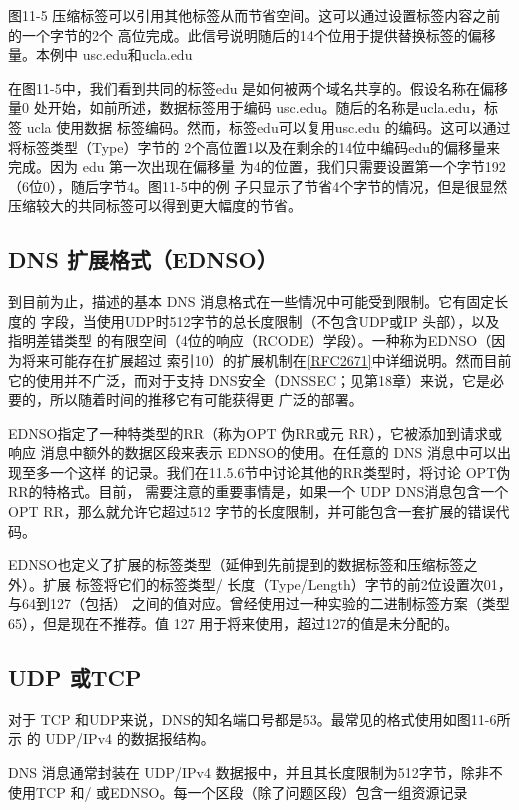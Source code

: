 图11-5 压缩标签可以引用其他标签从而节省空间。这可以通过设置标签内容之前的一个字节的2个
高位完成。此信号说明随后的14个位用于提供替换标签的偏移量。本例中 usc.edu和ucla.edu

在图11-5中，我们看到共同的标签edu 是如何被两个域名共享的。假设名称在偏移量0
处开始，如前所述，数据标签用于编码 usc.edu。随后的名称是ucla.edu，标签 ucla 使用数据
标签编码。然而，标签edu可以复用usc.edu 的编码。这可以通过将标签类型（Type）字节的
2个高位置1以及在剩余的14位中编码edu的偏移量来完成。因为 edu 第一次出现在偏移量
为4的位置，我们只需要设置第一个字节192（6位0），随后字节4。图11-5中的例
子只显示了节省4个字节的情况，但是很显然压缩较大的共同标签可以得到更大幅度的节省。

\subsection{DNS 扩展格式（EDNSO）}

到目前为止，描述的基本 DNS 消息格式在一些情况中可能受到限制。它有固定长度的
字段，当使用UDP时512字节的总长度限制（不包含UDP或IP 头部），以及指明差错类型
的有限空间（4位的响应（RCODE）学段）。一种称为EDNSO（因为将来可能存在扩展超过
索引10）的扩展机制在\href{https://www.rfc-editor.org/rfc/rfc2671}{[RFC2671]}中详细说明。然而目前它的使用并不广泛，而对于支持
DNS安全（DNSSEC；见第18章）来说，它是必要的，所以随着时间的推移它有可能获得更
广泛的部署。

EDNSO指定了一种特类型的RR（称为OPT 伪RR或元 RR），它被添加到请求或响应
消息中额外的数据区段来表示 EDNSO的使用。在任意的 DNS 消息中可以出现至多一个这样
的记录。我们在11.5.6节中讨论其他的RR类型时，将讨论 OPT伪 RR的特格式。目前，
需要注意的重要事情是，如果一个 UDP DNS消息包含一个 OPT RR，那么就允许它超过512
字节的长度限制，并可能包含一套扩展的错误代码。

EDNSO也定义了扩展的标签类型（延伸到先前提到的数据标签和压缩标签之外）。扩展
标签将它们的标签类型/ 长度（Type/Length）字节的前2位设置次01，与64到127（包括）
之间的值对应。曾经使用过一种实验的二进制标签方案（类型65），但是现在不推荐。值
127 用于将来使用，超过127的值是未分配的。

\subsection{UDP 或TCP}

对于 TCP 和UDP来说，DNS的知名端口号都是53。最常见的格式使用如图11-6所示
的 UDP/IPv4 的数据报结构。

DNS 消息通常封装在 UDP/IPv4 数据报中，并且其长度限制为512字节，除非不使用TCP 和/
或EDNSO。每一个区段（除了问题区段）包含一组资源记录

